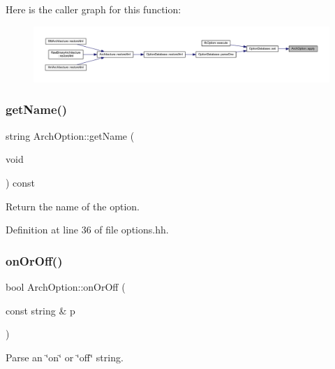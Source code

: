 Here is the caller graph for this function\+:
\nopagebreak
\begin{figure}[H]
\begin{center}
\leavevmode
\includegraphics[width=350pt]{class_arch_option_a5dc1b3adaee0d11e6018b85640272498_icgraph}
\end{center}
\end{figure}
\mbox{\label{class_arch_option_aac5f2ac365d3eaca6e68403183c7c8ac}} 
\subsubsection{\texorpdfstring{getName()}{getName()}}
{\footnotesize\ttfamily string Arch\+Option\+::get\+Name (\begin{DoxyParamCaption}\item[{void}]{ }\end{DoxyParamCaption}) const\hspace{0.3cm}{\ttfamily [inline]}}



Return the name of the option. 



Definition at line 36 of file options.\+hh.

\mbox{\label{class_arch_option_a20449a316e535886478bb1b73ac5ee68}} 
\subsubsection{\texorpdfstring{onOrOff()}{onOrOff()}}
{\footnotesize\ttfamily bool Arch\+Option\+::on\+Or\+Off (\begin{DoxyParamCaption}\item[{const string \&}]{p }\end{DoxyParamCaption})\hspace{0.3cm}{\ttfamily [static]}}



Parse an \char`\"{}on\char`\"{} or \char`\"{}off\char`\"{} string. 

